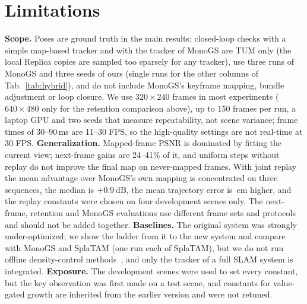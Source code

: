 \documentclass[10pt,twocolumn,letterpaper]{article}
\begin{document}
\section{Limitations}
\label{sec:limitations}
\textbf{Scope.} Poses are ground truth in the main results; closed-loop checks with a simple map-based tracker and with the tracker of MonoGS are TUM only (the local Replica copies are sampled too sparsely for any tracker), use three runs of MonoGS and three seeds of ours (single runs for the other columns of Tab.~\ref{tab:hybrid}), and do not include MonoGS's keyframe mapping, bundle adjustment or loop closure. We use $320{\times}240$ frames in most experiments ($640{\times}480$ only for the retention comparison above), up to 150 frames per run, a laptop GPU and two seeds that measure repeatability, not scene variance; frame times of 30--90\,ms are 11--30 FPS, so the high-quality settings are not real-time at 30 FPS. \textbf{Generalization.} Mapped-frame PSNR is dominated by fitting the current view; next-frame gains are 24--41\% of it, and uniform steps without replay do not improve the final map on never-mapped frames. With joint replay the mean advantage over MonoGS's own mapping is concentrated on three sequences, the median is $+0.9$\,dB, the mean trajectory error is \engHybAteDiff\,cm higher, and the replay constants were chosen on four development scenes only. The next-frame, retention and MonoGS evaluations use different frame sets and protocols and should not be added together. \textbf{Baselines.} The original system was strongly under-optimized; we show the ladder from it to the new system and compare with MonoGS and SplaTAM (one run each of SplaTAM), but we do not run offline density-control methods~\cite{mallick2024taming,fang2024minisplatting,zhang2024pixelgs,kheradmand20243dgsmcmc}, and only the tracker of a full SLAM system is integrated. \textbf{Exposure.} The development scenes were used to set every constant, but the key observation was first made on a test scene, and constants for value-gated growth are inherited from the earlier version and were not retuned.
\end{document}
